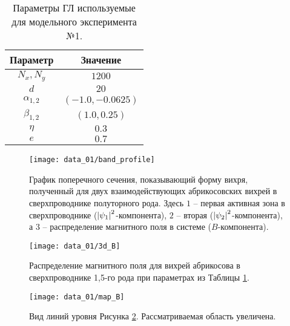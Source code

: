 
\begin{table}[h!]
    \centering
    \begin{tabular}{|c|c|}
        \hline 
        Параметр           & Значение              \\ \hline
        \( N_x, N_y \)     & \( 1200 \)            \\ \hline
        \( d \)            & \( 20 \)              \\ \hline
        \( \alpha_{1,2} \) & \( (-1.0, -0.0625) \) \\ \hline
        \( \beta_{1,2} \)  & \( (1.0, 0.25) \)     \\ \hline
        \( \eta \)         & \( 0.3 \)             \\ \hline
        \( e \)            & \( 0.7 \)             \\ \hline
    \end{tabular}
    \caption{Параметры ГЛ используемые для модельного эксперимента №1.}
    \label{param:01}
\end{table}

\begin{figure}[h!]
    \center
    \texttt{[image: data\_01/band\_profile]}
    \caption{График поперечного сечения, показывающий форму вихря, полученный 
        для двух взаимодействующих абрикосовских вихрей в сверхпроводнике 
        полуторного рода. Здесь \( 1 \) -- первая активная зона в 
        сверхпроводнике (\( \left| \psi_1 \right|^2 \)-компонента), \( 2 \) -- вторая 
        (\( \left| \psi_2 \right|^2 \)-компонента), а \( 3 \) -- распределение 
        магнитного поля в системе (\( B \)-компонента).}
    \label{img:band-profile-01}
\end{figure}

\begin{figure}[h!]
    \center
    \texttt{[image: data\_01/3d\_B]}
    \caption{Распределение магнитного поля для вихрей абрикосова в 
        сверхпроводнике 1,5-го рода при параметрах из Таблицы \ref{param:01}.}
    \label{img:3d-field-B-01}
\end{figure}

\begin{figure}[h!]
    \center
    \texttt{[image: data\_01/map\_B]}
    \caption{Вид линий уровня Рисунка \ref{img:3d-field-B-01}. 
        Рассматриваемая область увеличена.}
    \label{img:map-field-B-01}
\end{figure}

